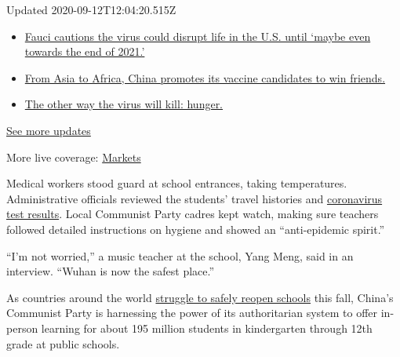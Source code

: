 Updated 2020-09-12T12:04:20.515Z

\begin{itemize}
\tightlist
\item
  \href{https://www.nytimes3xbfgragh.onion/2020/09/11/world/covid-19-coronavirus.html?action=click\&pgtype=Article\&state=default\&region=MAIN_CONTENT_1\&context=storylines_live_updates\#link-dfb8a16}{Fauci
  cautions the virus could disrupt life in the U.S. until `maybe even
  towards the end of 2021.'}
\item
  \href{https://www.nytimes3xbfgragh.onion/2020/09/11/world/covid-19-coronavirus.html?action=click\&pgtype=Article\&state=default\&region=MAIN_CONTENT_1\&context=storylines_live_updates\#link-7104d154}{From
  Asia to Africa, China promotes its vaccine candidates to win friends.}
\item
  \href{https://www.nytimes3xbfgragh.onion/2020/09/11/world/covid-19-coronavirus.html?action=click\&pgtype=Article\&state=default\&region=MAIN_CONTENT_1\&context=storylines_live_updates\#link-393ad215}{The
  other way the virus will kill: hunger.}
\end{itemize}

\href{https://www.nytimes3xbfgragh.onion/2020/09/11/world/covid-19-coronavirus.html?action=click\&pgtype=Article\&state=default\&region=MAIN_CONTENT_1\&context=storylines_live_updates}{See
more updates}

More live coverage:
\href{https://www.nytimes3xbfgragh.onion/live/2020/09/11/business/stock-market-today-coronavirus?action=click\&pgtype=Article\&state=default\&region=MAIN_CONTENT_1\&context=storylines_live_updates}{Markets}

Medical workers stood guard at school entrances, taking temperatures.
Administrative officials reviewed the students' travel histories and
\href{https://www.nytimes3xbfgragh.onion/2020/05/26/world/asia/coronavirus-wuhan-tests.html}{coronavirus
test results}. Local Communist Party cadres kept watch, making sure
teachers followed detailed instructions on hygiene and showed an
``anti-epidemic spirit.''

``I'm not worried,'' a music teacher at the school, Yang Meng, said in
an interview. ``Wuhan is now the safest place.''

As countries around the world
\href{https://www.nytimes3xbfgragh.onion/2020/09/01/world/schools-reopen-globe-students.html}{struggle
to safely reopen schools} this fall, China's Communist Party is
harnessing the power of its authoritarian system to offer in-person
learning for about 195 million students in kindergarten through 12th
grade at public schools.

